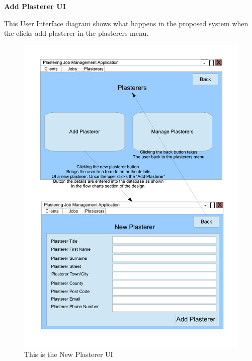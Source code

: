 \pagebreak
\textbf{Add Plasterer UI}
\begin{flushleft}
This User Interface diagram shows what happens in the proposed system when the clicks add plasterer in the plasterers menu.
\end{flushleft}
\begin{figure}[H]
\includegraphics[scale=0.5]{./Design/images/NewPlasterer.pdf}
    \caption{This is the New Plasterer UI} 
\label{fig:FlowChartNewPlasterer}
\end{figure}

